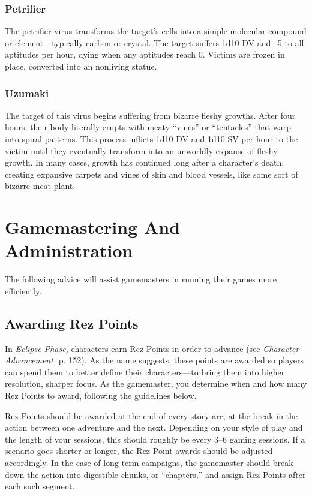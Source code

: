 \subsubsection{Petrifier}

The petrifier virus transforms the target's cells into 
a simple molecular compound or element—typically 
carbon or crystal. The target suffers 1d10 DV and –5 
to all aptitudes per hour, dying when any aptitudes 
reach 0. Victims are frozen in place, converted into an 
nonliving statue.

\subsubsection{Uzumaki}

The target of this virus begins suffering from bizarre 
fleshy growths. After four hours, their body literally 
erupts with meaty ``vines'' or ``tentacles'' that warp 
into spiral patterns. This process inflicts 1d10 DV and 
1d10 SV per hour to the victim until they eventually 
transform into an unworldly expanse of fleshy growth. 
In many cases, growth has continued long after a 
character's death, creating expansive carpets and vines 
of skin and blood vessels, like some sort of bizarre 
meat plant.

\section{Gamemastering And Administration }

The following advice will assist gamemasters in running
their games more efficiently.

\subsection{Awarding Rez Points }

In \textit{Eclipse Phase,} characters earn Rez Points in order 
to advance (see \textit{Character Advancement,} p. 152). As 
the name suggests, these points are awarded so players 
can spend them to better define their characters—to 
bring them into higher resolution, sharper focus. As 
the gamemaster, you determine when and how many 
Rez Points to award, following the guidelines below.

Rez Points should be awarded at the end of every 
story arc, at the break in the action between one adventure
and the next. Depending on your style of play
and the length of your sessions, this should roughly be 
every 3–6 gaming sessions. If a scenario goes shorter 
or longer, the Rez Point awards should be adjusted 
accordingly. In the case of long-term campaigns, the 
gamemaster should break down the action into digestible
chunks, or ``chapters,'' and assign Rez Points after
each such segment.

